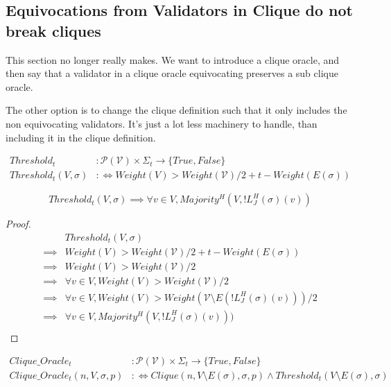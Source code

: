 \subsection{Equivocations from Validators in Clique do not break cliques}

This section no longer really makes. We want to introduce a clique oracle, and then say that a validator in a clique oracle equivocating preserves a sub clique oracle.

The other option is to change the clique definition such that it only includes the non equivocating validators. It's just a lot less machinery to handle, than including it in the clique definition.

\begin{defn}
\begin{align}
Threshold_t&: \mathcal{P}(\mathcal{V}) \times \Sigma_t \to \{True, False\} \\
Threshold_t(V, \sigma) &:\Leftrightarrow Weight(V) > Weight(\mathcal{V})/2 + t - Weight(E(\sigma))
\end{align}
\end{defn}

\begin{lemma}
  $$
    Threshold_t(V, \sigma) \implies \forall v \in V, Majority^H(V, !L^H_J(\sigma)(v))
  $$
\end{lemma}

\begin{proof}
  \begin{align}
            & Threshold_t(V, \sigma) \\
    \implies& Weight(V) > Weight(\mathcal{V})/2 + t - Weight(E(\sigma)) \\
    \implies& Weight(V) > Weight(\mathcal{V})/2 \\
    \implies& \forall v \in V, Weight(V) > Weight(\mathcal{V})/2 \\
    \implies& \forall v \in V, Weight(V) > Weight(\mathcal{V} \setminus E(!L^H_J(\sigma)(v)))/2 \\
    \implies& \forall v \in V, Majority^H(V, !L^H_J(\sigma)(v))) \\
  \end{align}
\end{proof}


\begin{defn}
\begin{align}
Clique\_Oracle_t&: \mathcal{P}(\mathcal{V}) \times \Sigma_t \to \{True, False\} \\
Clique\_Oracle_t(n, V, \sigma, p) &:\Leftrightarrow Clique(n, V \setminus E(\sigma), \sigma, p) \land Threshold_t(V \setminus E(\sigma), \sigma) \\
\end{align}
\end{defn}

